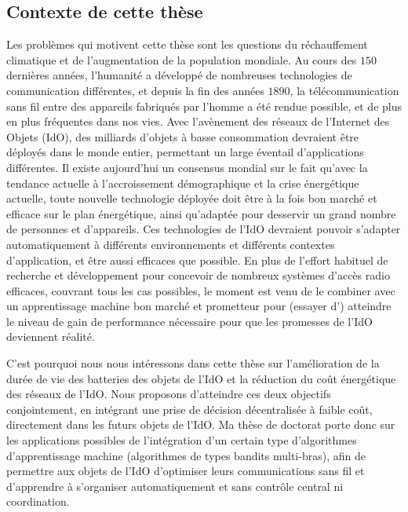 \begin{resume_fr}
\section*{Contexte de cette thèse}


%
Les problèmes qui motivent cette thèse sont les questions du réchauffement climatique et de l'augmentation de la population mondiale.
Au cours des $150$ dernières années, l'humanité a développé de nombreuses technologies de communication différentes, et depuis la fin des années $1890$, la télécommunication sans fil entre des appareils fabriqués par l'homme a été rendue possible, et de plus en plus fréquentes dans nos vies.
Avec l'avènement des réseaux de l'Internet des Objets (IdO), des milliards d'objets à basse consommation devraient être déployés dans le monde entier, permettant un large éventail d'applications différentes.
Il existe aujourd'hui un consensus mondial sur le fait qu'avec la tendance actuelle à l'accroissement démographique et la crise énergétique actuelle, toute nouvelle technologie déployée doit être à la fois bon marché et efficace sur le plan énergétique,
ainsi qu'adaptée pour desservir un grand nombre de personnes et d'appareils.
%
Ces technologies de l'IdO devraient pouvoir s'adapter automatiquement à différents environnements et différents contextes d'application, et être aussi efficaces que possible.
%
En plus de l'effort habituel de recherche et développement pour concevoir de nombreux systèmes d'accès radio efficaces, couvrant tous les cas possibles,
le moment est venu de le combiner avec un apprentissage machine bon marché et prometteur pour (essayer d') atteindre le niveau de gain de performance nécessaire pour que les promesses de l'IdO deviennent réalité.


C'est pourquoi nous nous intéressons dans cette thèse sur
l'amélioration de la durée de vie des batteries des objets de l'IdO et la réduction du coût énergétique des réseaux de l'IdO.
Nous proposons d'atteindre ces deux objectifs conjointement, en intégrant une prise de décision décentralisée à faible coût, directement dans les futurs objets de l'IdO.
%
Ma thèse de doctorat porte donc sur les applications possibles de l'intégration d'un certain type d'algorithmes d'apprentissage machine (algorithmes de types bandits multi-bras), afin de permettre aux objets de l'IdO d'optimiser leurs communications sans fil et d'apprendre à s'organiser automatiquement et sans contrôle central ni coordination.



\end{resume_fr}
